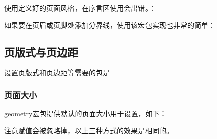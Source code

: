     使用定义好的页面风格，在序言区使用会出错。：

    如果要在页眉或页脚处添加分界线，使用该宏包实现也非常的简单：
    \begin{texcode}
    \end{texcode}

    \subsection{页版式与页边距}
    设置页版式和页边距等需要的包是
    \subsubsection{页面大小}
    geometry宏包提供默认的页面大小用于设置，如下：
    \begin{texcode}
        \usepackage[a4paper]{geometry}%
        \usepackage[a4paper=true]{geometry}%
        \usepackage[a4paper=false]{geometry}%
    \end{texcode}
    注意赋值会被忽略掉，以上三种方式的效果是相同的。

